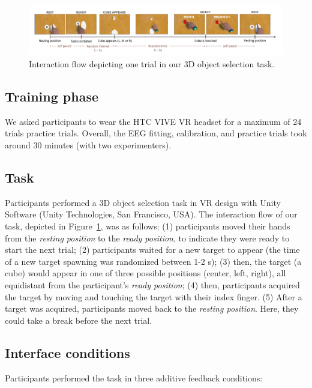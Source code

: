 \begin{figure}[!ht]
\includegraphics[width=\linewidth]{figures/Task_mismatch.PNG}
\vspace{-15pt}
\caption{Interaction flow depicting one trial in our 3D object selection task.}
\label{task_flow}
\end{figure}

\subsection{Training phase}
We asked participants to wear the HTC VIVE VR headset for a maximum of 24 trials practice trials. Overall, the EEG fitting, calibration, and practice trials took around 30 minutes (with two experimenters).

\subsection{Task}
Participants performed a 3D object selection task in VR design with Unity Software (Unity Technologies, San Francisco, USA). The interaction flow of our task, depicted in Figure~\ref{task_flow}, was as follows: (1) participants moved their hands from the \textit{resting position} to the \textit{ready position}, to indicate they were ready to start the next trial; (2) participants waited for a new target to appear (the time of a new target spawning was randomized between 1-2 s); (3) then, the target (a cube) would appear in one of three possible positions (center, left, right), all equidistant from the participant's \textit{ready position}; (4) then, participants acquired the target by moving and touching the target with their index finger. (5) After a target was acquired, participants moved back to the \textit{resting position}. Here, they could take a break before the next trial.

\subsection{Interface conditions}
Participants performed the task in three additive feedback conditions:

